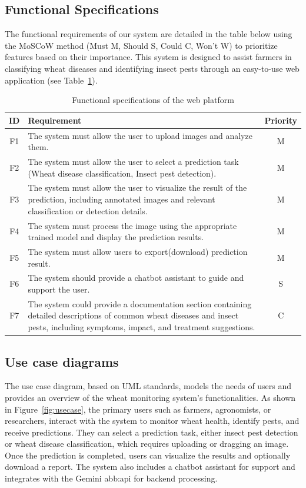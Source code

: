 \subsection{Functional Specifications}
The functional requirements of our system are detailed in the table below using the MoSCoW method (Must M, Should S, Could C, Won’t W) to prioritize features based on their importance. This system is designed to assist farmers in classifying wheat diseases and identifying insect pests through an easy-to-use web application (see Table~\ref{tab:FunctionalSpecifications}).


\begin{table}[h!]
\centering
\caption{Functional specifications of the web platform}
\begin{tabular}{|c|p{12cm}|c|}
\hline
\textbf{ID} & \textbf{Requirement} & \textbf{Priority} \\
\hline
F1 & The system must allow the user to upload images and analyze them. & M \\
\hline
F2 & The system must allow the user to select a prediction task (Wheat disease classification, Insect pest detection). & M \\
\hline
F3 & The system must allow the user to visualize the result of the prediction, including annotated images and relevant classification or detection details. & M \\
\hline
F4 & The system must process the image using the appropriate trained model and display the prediction results. & M \\
\hline
F5 & The system must allow users to export(download) prediction result. & M \\
\hline
F6 & The system should provide a chatbot assistant to guide and support the user. & S \\
\hline
F7 & The system could provide a documentation section containing detailed descriptions of common wheat diseases and insect pests, including symptoms, impact, and treatment suggestions. & C \\
\hline
\end{tabular}
\label{tab:FunctionalSpecifications}
\end{table}



\subsection{Use case diagrams}
The use case diagram, based on UML standards, models the needs of users and provides an overview of the wheat monitoring system's functionalities. As shown in Figure~\ref{fig:usecase}, the primary users such as farmers, agronomists, or researchers, interact with the system to monitor wheat health, identify pests, and receive predictions. They can select a prediction task, either insect pest detection or wheat disease classification, which requires uploading or dragging an image. Once the prediction is completed, users can visualize the results and optionally download a report. The system also includes a chatbot assistant for support and integrates with the Gemini \gls{abb:api} for backend processing.


